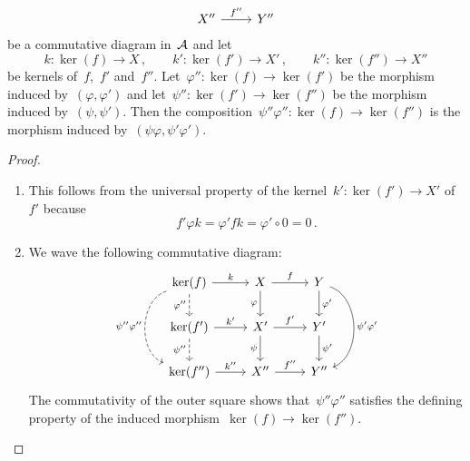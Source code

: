 \begin{lemma}
\begin{enumerate}
\[\begin{tikzcd}
          \\
            X''
            \arrow{r}[above]{f''}
          & Y''
        \end{tikzcd}
      \]
      be a commutative diagram in~$\mathcal{A}$ and let
      \[
        k \colon \ker(f) \to X \,,
        \qquad
        k' \colon \ker(f') \to X' \,,
        \qquad
        k'' \colon \ker(f'') \to X''
      \]
      be kernels of~$f$,~$f'$ and~$f''$.
      Let~$\varphi'' \colon \ker(f) \to \ker(f')$ be the morphism induced by~$(\varphi,\varphi')$ and let~$\psi'' \colon \ker(f') \to \ker(f'')$ be the morphism induced by~$(\psi, \psi')$.
      Then the composition~$\psi'' \varphi'' \colon \ker(f) \to \ker(f'')$ is the morphism induced by~$(\psi \varphi, \psi' \varphi')$.
  \end{enumerate}
\end{lemma}

\begin{proof}
  \leavevmode
  \begin{enumerate}
    \item
      This follows from the universal property of the kernel~$k' \colon \ker(f') \to X'$ of~$f'$ because
      \[
          f' \varphi k
        = \varphi' f k
        = \varphi' \circ 0
        = 0 \,.
      \]
    \item
    We wave the following commutative diagram:
    \[
        \begin{tikzcd}
            \ker(f)
            \arrow{r}[above]{k}
            \arrow[dashed]{d}[left]{\varphi''}
            \arrow[dashed, bend right = 70]{dd}[left]{\psi'' \varphi''}
          & X
            \arrow{r}[above]{f}
            \arrow{d}[left]{\varphi}
          & Y
            \arrow{d}[right]{\varphi'}
            \arrow[bend left = 70]{dd}[right]{\psi' \varphi'}
          \\
            \ker(f')
            \arrow{r}[above]{k'}
            \arrow[dashed]{d}[left]{\psi''}
          & X'
            \arrow{r}[above]{f'}
            \arrow{d}[left]{\psi}
          & Y'
            \arrow{d}[right]{\psi'}
          \\
            \ker(f'')
            \arrow{r}[above]{k''}
          & X''
            \arrow{r}[above]{f''}
          & Y''
        \end{tikzcd}
      \]
      The commutativity of the outer square shows that~$\psi'' \varphi''$ satisfies the defining property of the induced morphism~$\ker(f) \to \ker(f'')$.
    \qedhere
  \end{enumerate}
\end{proof}

